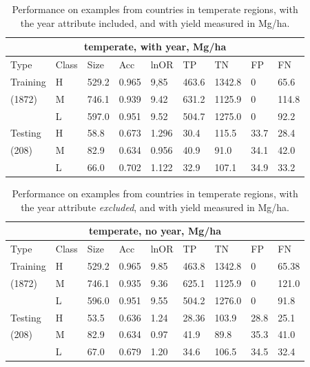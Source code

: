\documentclass[11pt]{article}
\begin{document}
\begin{table}[h!]
\centering
\begin{tabular}{lllllllll}
\toprule
\multicolumn{9}{c}{\textbf{temperate, with year, Mg/ha}} \\
\midrule
Type & Class & Size & Acc & lnOR & TP & TN & FP & FN \\
\midrule
Training & H & 529.2 & 0.965 & 9,85 & 463.6 & 1342.8 & 0 & 65.6  \\
(1872) & M & 746.1 & 0.939 & 9.42 & 631.2 & 1125.9 & 0 & 114.8  \\
& L & 597.0 & 0.951 & 9.52 & 504.7 & 1275.0 & 0 & 92.2  \\
Testing & H & 58.8 & 0.673 & 1.296 & 30.4 & 115.5 & 33.7 & 28.4  \\
(208) & M & 82.9 & 0.634 & 0.956 & 40.9 & 91.0 & 34.1 & 42.0  \\
& L & 66.0 & 0.702 & 1.122 & 32.9 & 107.1 & 34.9 & 33.2  \\
\bottomrule
\end{tabular}
\caption{Performance on examples from countries in temperate regions, with the year attribute included, and with yield measured in Mg/ha.}
\label{t.wy.temp_results}
\end{table}

\begin{table}[h!]
\centering
\begin{tabular}{lllllllll}
\toprule
\multicolumn{9}{c}{\textbf{temperate, no year, Mg/ha}} \\
\midrule
Type & Class & Size & Acc & lnOR & TP & TN & FP & FN \\
\midrule
Training & H & 529.2 & 0.965 & 9.85 & 463.8 & 1342.8 & 0 & 65.38  \\
(1872) & M & 746.1 & 0.935 & 9.36 & 625.1 & 1125.9 & 0 & 121.0  \\
& L & 596.0 & 0.951 & 9.55 & 504.2 & 1276.0 & 0 & 91.8  \\
Testing & H & 53.5 & 0.636 & 1.24 & 28.36 & 103.9 & 28.8 & 25.1  \\
(208) & M & 82.9 & 0.634 & 0.97 & 41.9 & 89.8 & 35.3 & 41.0  \\
& L & 67.0 & 0.679 & 1.20 & 34.6 & 106.5 & 34.5 & 32.4  \\
\bottomrule
\end{tabular}
\caption{Performance on examples from countries in temperate regions, with the year attribute \emph{excluded}, and with yield measured in Mg/ha.}
\label{t.ny.temp_results}
\end{table}
\end{document}
